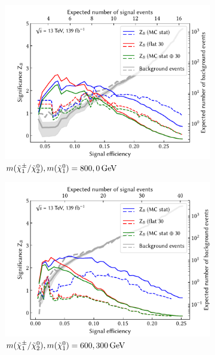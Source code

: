 \begin{figure}[hb]
\begin{subfigure}[b]{0.5\linewidth}
		\centering\includegraphics[width=1.0\textwidth]{N-1_cut_scan/z_vs_effs_800_0.pdf}
		\caption{$m(\charg/\neutr), m(\lsp) =  800, \SI{0}{\GeV}$}
	\end{subfigure}\hfill
	\begin{subfigure}[b]{0.5\linewidth}
		\centering\includegraphics[width=1.0\textwidth]{N-1_cut_scan/z_vs_effs_600_300.pdf}
		\caption{$m(\charg/\neutr), m(\lsp) =  600, \SI{300}{\GeV}$}
	\end{subfigure}\hfill
	\par\bigskip
	\begin{subfigure}[b]{0.5\linewidth}

\end{subfigure}
\end{figure}

